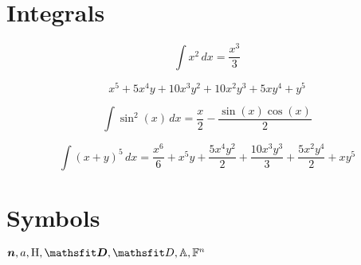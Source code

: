 \documentclass[12pt]{article}
\begin{document}
    \section{Integrals}\label{sec:integrals}

    \begin{equation}
        \int x^{2}\, dx = \frac{x^{3}}{3}
    \end{equation}

    \begin{equation}
        x^{5} + 5 x^{4} y + 10 x^{3} y^{2} + 10 x^{2} y^{3} + 5 x y^{4} + y^{5}
    \end{equation}

    \begin{equation}
        \int \sin^{2}{\left(x \right)}\, dx = \frac{x}{2} - \frac{\sin{\left(x \right)} \cos{\left(x \right)}}{2}
    \end{equation}

    \begin{equation}
        \int \left(x + y\right)^{5}\, dx = \frac{x^{6}}{6} + x^{5} y + \frac{5 x^{4} y^{2}}{2} + \frac{10 x^{3} y^{3}}{3} + \frac{5 x^{2} y^{4}}{2} + x y^{5}
    \end{equation}


    \section{Symbols}\label{sec:symbols}
    \begin{math}
        \vn, \eva, \ermH, \tD, \etD, \sA, \sF^{n}
    \end{math}
\end{document}
